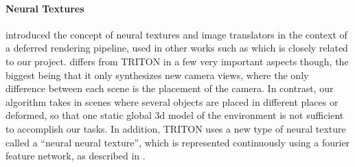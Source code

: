 \documentclass{article}
\begin{document}
\vspace{-8pt}
\paragraph{Neural Textures}
\citet{deferred_neural_rendering} introduced the concept of neural textures and image translators in the context of a deferred rendering pipeline, used in other works such as \cite{surgical_video_translation} which is closely related to our project. 
\citet{surgical_video_translation} differs from TRITON in a few very important aspects though, the biggest being that it only synthesizes new camera views, where the only difference between each scene is the placement of the camera. In contrast, our algorithm takes in scenes where several objects are placed in different places or deformed, so that one static  global 3d model of the environment is not sufficient to accomplish our tasks. In addition, TRITON uses a new type of neural texture called a ``neural neural texture'', which is represented continuously using a fourier feature network, as described in \citet{fourier_feature_networks}.













\end{document}
